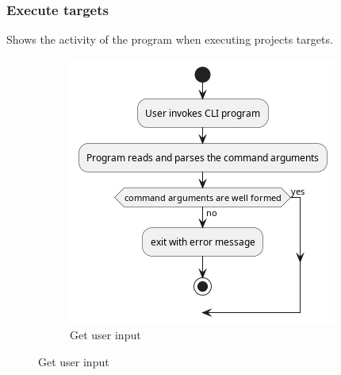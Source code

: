 \documentclass[11pt]{article}
\begin{document}
\subsubsection{Execute targets}

Shows the activity of the program when executing projects \glspl{target}.

\begin{figure}[htbp]

  \begin{minipage}{0.45\textwidth}
    \centering
    \begin{subfigure}[b]{\linewidth}
      \includegraphics[width=\linewidth]{diags/activity.png}
      \caption{Get user input}
    \end{subfigure}

    \bigskip
    \addtocounter{subfigure}{1}


\end{minipage}
\end{figure}
\end{document}
